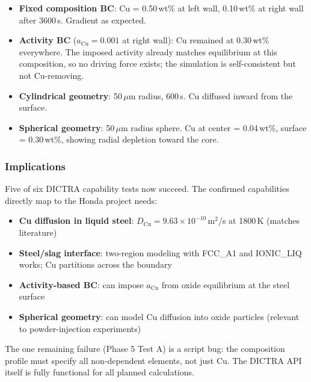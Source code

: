 \documentclass[11pt]{article}
\begin{document}
\begin{itemize}[leftmargin=*]
    \item \textbf{Fixed composition BC}: Cu = 0.50\,wt\% at left wall, 0.10\,wt\% at right wall after 3600\,s. Gradient as expected.
    \item \textbf{Activity BC} ($a_{\text{Cu}} = 0.001$ at right wall): Cu remained at 0.30\,wt\% everywhere. The imposed activity already matches equilibrium at this composition, so no driving force exists; the simulation is self-consistent but not Cu-removing.
    \item \textbf{Cylindrical geometry}: 50\,$\mu$m radius, 600\,s. Cu diffused inward from the surface.
    \item \textbf{Spherical geometry}: 50\,$\mu$m radius sphere. Cu at center = 0.04\,wt\%, surface = 0.30\,wt\%, showing radial depletion toward the core.
\end{itemize}

\subsubsection{Implications}

Five of six DICTRA capability tests now succeed. The confirmed capabilities directly map to the Honda project needs:

\begin{itemize}[leftmargin=*]
    \item \textbf{Cu diffusion in liquid steel}: $D_{\text{Cu}} = 9.63 \times 10^{-10}$\,m$^2$/s at 1800\,K (matches literature)
    \item \textbf{Steel/slag interface}: two-region modeling with FCC\_A1 and IONIC\_LIQ works; Cu partitions across the boundary
    \item \textbf{Activity-based BC}: can impose $a_{\text{Cu}}$ from oxide equilibrium at the steel surface
    \item \textbf{Spherical geometry}: can model Cu diffusion into oxide particles (relevant to powder-injection experiments)
\end{itemize}

The one remaining failure (Phase 5 Test A) is a script bug: the composition profile must specify all non-dependent elements, not just Cu. The DICTRA API itself is fully functional for all planned calculations.


\end{document}
